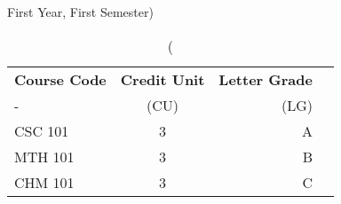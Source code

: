 \documentclass{article}
\begin{document}
\begin{table}[h!]
	\begin{center}
		\caption(First Year, First Semester)
		\label{tab:tabble}
		\begin{tabular}{l|c|r|c}
			\textbf{Course Code} & \textbf{Credit Unit} &
			\textbf{Letter Grade} \\
			- & (CU) & (LG) \\
			\hline
			CSC 101 & 3 & A\\
			MTH 101 & 3 & B\\
			CHM 101 & 3 & C\\
		\end{tabular}
	\end{center}
\end{table}
\end{document}
